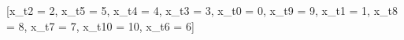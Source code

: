 [x_t2 = 2,
 x_t5 = 5,
 x_t4 = 4,
 x_t3 = 3,
 x_t0 = 0,
 x_t9 = 9,
 x_t1 = 1,
 x_t8 = 8,
 x_t7 = 7,
 x_t10 = 10,
 x_t6 = 6]